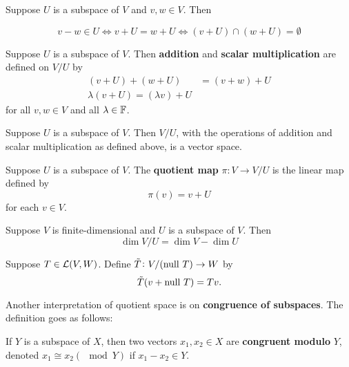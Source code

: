 \documentclass{extarticle}
\begin{document}
\begin{lemma}
    Suppose \(U\) is a subspace of \(V\) and \(v, w \in V\). Then 

    \[v - w \in U \Longleftrightarrow v + U = w + U \Longleftrightarrow (v + U) \cap (w + U) = \emptyset\]
\end{lemma}

\begin{definition}
    Suppose \(U\) is a subspace of \(V\). Then \textbf{addition} and \textbf{scalar multiplication} 
    are defined on \(V / U\) by 
    \begin{align*}
        (v + U) + (w + U) &= (v+w) + U \\ 
        \lambda (v+U) = (\lambda v) + U 
    \end{align*}
    for all \(v, w \in V\) and all \(\lambda \in \mathbb{F}\). 
\end{definition}

\begin{thm}
    Suppose \(U\) is a subspace of \(V\). Then \(V / U\), with the operations of addition and 
    scalar multiplication as defined above, is a vector space. 
\end{thm}

\begin{definition}
    Suppose \(U\) is a subspace of \(V\). The \textbf{quotient map} \(\pi \colon 
    V \to V / U\) is the linear map defined by 
    \[\pi(v) = v + U\]
    for each \(v \in V\). 
\end{definition}

\begin{thm}
    Suppose \(V\) is finite-dimensional and \(U\) is a subspace of \(V\). Then 
    \[\dim V/U = \dim V - \dim U\]
\end{thm}

\begin{definition}
    Suppose \(T \in \mathcal{L}(V, W)\). Define \(\Tilde{T} \colon V / (\text{null } T) \to W\) by 
    \[\Tilde{T} (v + \text{null } T) = Tv.\]
\end{definition}

Another interpretation of quotient space is on \textbf{congruence of subspaces}. The definition goes 
as follows:

If \(Y\) is a subspace of \(X\), then two vectors \(x_1, x_2 \in X\) are \textbf{congruent modulo} \(Y\),
denoted \(x_1 \cong x_2 (\mod Y)\) if \(x_1 - x_2 \in Y\).
\end{document}
